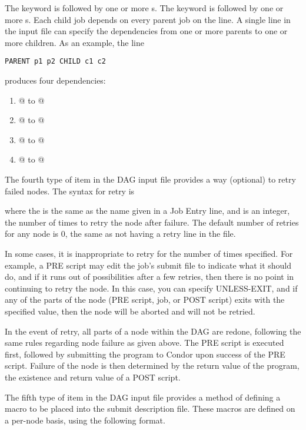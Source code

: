 The  keyword is followed by one or more
s.
The  keyword is followed by one or more
s.
Each child job depends on every parent job on the line.
A single line in the input file can specify the dependencies from one or more
parents to one or more children.
As an example, the line
\begin{verbatim}
PARENT p1 p2 CHILD c1 c2
\end{verbatim}
produces four dependencies:
\begin{enumerate}
\item{@ to @}
\item{@ to @}
\item{@ to @}
\item{@ to @}
\end{enumerate}

The fourth type of item in the DAG input file provides a
way (optional) to retry failed nodes.
The syntax for retry is

   

where the  is the same as the name given in
a Job Entry line, and  is an integer,
the number of times to retry the node after failure.
The default number of retries for any node is 0,
the same as not having a retry line in the file. 

In some cases, it is inappropriate to retry for the number of times
specified. For example, a PRE script may edit the job's submit file to
indicate what it should do, and if it runs out of possibilities after
a few retries, then there is no point in continuing to retry the
node. In this case, you can specify UNLESS-EXIT, and if any of the
parts of the node (PRE script, job, or POST script) exits with the
specified value, then the node will be aborted and will not be
retried.

In the event of retry, all parts of a node within the DAG
are redone, following the same rules regarding node failure
as given above.
The PRE script is executed first,
followed by submitting the program to Condor upon success of
the PRE script.
Failure of the node is then determined by the return value of
the program, the existence and return value of a POST script.

The fifth type of item in the DAG input file provides a
method of defining a macro to be placed into the submit description
file.
These macros are defined on a per-node basis, using the
following format.

